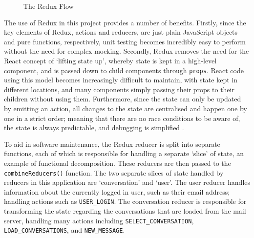 \begin{figure}[h!]
  \begin{center}
    \caption{The Redux Flow}
    \label{fig:redux-cycle}
  \end{center}
\end{figure}

The use of Redux in this project provides a number of benefits. Firstly, since the key elements of Redux, actions and reducers, are just plain JavaScript objects and pure functions, respectively, unit testing becomes incredibly easy to perform without the need for complex mocking. Secondly, Redux removes the need for the React concept of `lifting state up', whereby state is kept in a high-level component, and is passed down to child components through \verb|props|. React code using this model becomes increasingly difficult to maintain, with state kept in different locations, and many components simply passing their props to their children without using them. Furthermore, since the state can only be updated by emitting an action, all changes to the state are centralised and happen one by one in a strict order; meaning that there are no race conditions to be aware of, the state is always predictable, and debugging is simplified \cite{redux-three-principles}.

To aid in software maintenance, the Redux reducer is split into separate functions, each of which is responsible for handling a separate `slice' of state, an example of functional decomposition. These reducers are then passed to the \verb|combineReducers()| function. The two separate slices of state handled by reducers in this application are `conversation' and `user'. The user reducer handles information about the currently logged in user, such as their email address; handling actions such as \verb|USER_LOGIN|. The conversation reducer is responsible for transforming the state regarding the conversations that are loaded from the mail server, handling many actions including \verb|SELECT_CONVERSATION|, \verb|LOAD_CONVERSATIONS|, and \verb|NEW_MESSAGE|.


